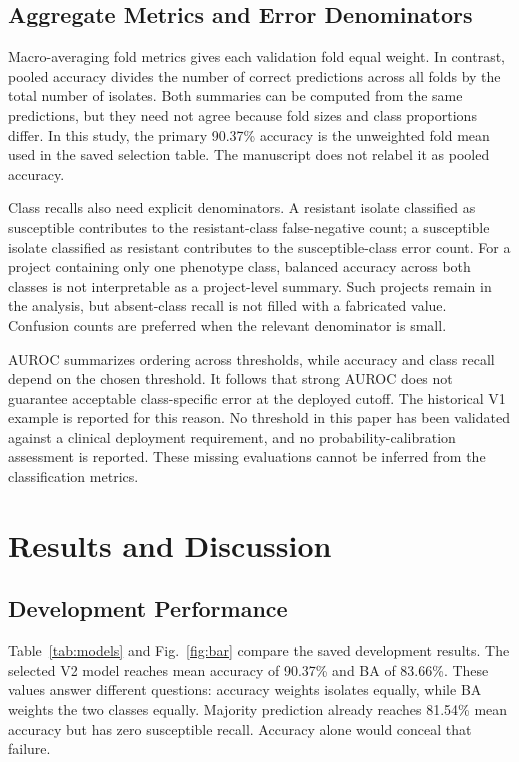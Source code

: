 \documentclass[conference]{IEEEtran}
\begin{document}
\subsection{Aggregate Metrics and Error Denominators}
Macro-averaging fold metrics gives each validation fold equal weight. In contrast, pooled accuracy divides the number of correct predictions across all folds by the total number of isolates. Both summaries can be computed from the same predictions, but they need not agree because fold sizes and class proportions differ. In this study, the primary 90.37\% accuracy is the unweighted fold mean used in the saved selection table. The manuscript does not relabel it as pooled accuracy.

Class recalls also need explicit denominators. A resistant isolate classified as susceptible contributes to the resistant-class false-negative count; a susceptible isolate classified as resistant contributes to the susceptible-class error count. For a project containing only one phenotype class, balanced accuracy across both classes is not interpretable as a project-level summary. Such projects remain in the analysis, but absent-class recall is not filled with a fabricated value. Confusion counts are preferred when the relevant denominator is small.

AUROC summarizes ordering across thresholds, while accuracy and class recall depend on the chosen threshold. It follows that strong AUROC does not guarantee acceptable class-specific error at the deployed cutoff. The historical V1 example is reported for this reason. No threshold in this paper has been validated against a clinical deployment requirement, and no probability-calibration assessment is reported. These missing evaluations cannot be inferred from the classification metrics.


\section{Results and Discussion}
\subsection{Development Performance}
Table~\ref{tab:models} and Fig.~\ref{fig:bar} compare the saved development results. The selected V2 model reaches mean accuracy of 90.37\% and BA of 83.66\%. These values answer different questions: accuracy weights isolates equally, while BA weights the two classes equally. Majority prediction already reaches 81.54\% mean accuracy but has zero susceptible recall. Accuracy alone would conceal that failure.
\end{document}
